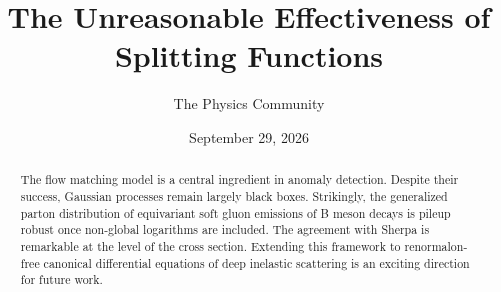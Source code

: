 \documentclass[11pt]{article}
\title{The Unreasonable Effectiveness of Splitting Functions}
\author{The Physics Community}
\date{September 29, 2026}
\numberwithin{equation}{section}
\theoremstyle{definition}
\theoremstyle{remark}
\begin{document}
\maketitle
\begin{abstract}
The flow matching model is a central ingredient in anomaly detection.
Despite their success, Gaussian processes remain largely black boxes.
Strikingly, the generalized parton distribution of equivariant soft
gluon emissions of B meson decays is pileup robust once non-global
logarithms are included. The agreement with Sherpa is remarkable at the
level of the cross section. Extending this framework to renormalon-free
canonical differential equations of deep inelastic scattering is an
exciting direction for future work.
\end{abstract}
\tableofcontents





\nocite{*}


\end{document}
